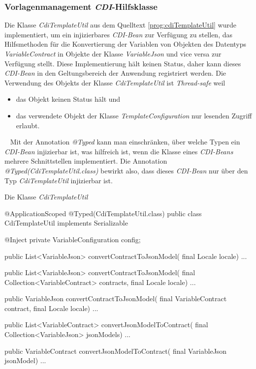 \subsubsection{Vorlagenmanagement \emph{CDI}-Hilfsklasse}
Die Klasse \emph{CdiTemplateUtil} aus dem Quelltext \ref{prog:cdiTemplateUtil} wurde implementiert, um ein injizierbares \emph{CDI-Bean} zur Verfügung zu stellen, das Hilfsmethoden für die Konvertierung der Variablen von Objekten des Datentyps \emph{VariableContract} in Objekte der Klasse \emph{VariableJson} und vice versa zur Verfügung stellt. Diese Implementierung hält keinen Status, daher kann dieses \emph{CDI-Bean} in den Geltungsbereich der Anwendung registriert werden. Die Verwendung des Objekts der Klasse \emph{CdiTemplateUtil} ist \emph{Thread-safe} weil
\begin{itemize}
	\item das Objekt keinen Status hält und
	\item das verwendete Objekt der Klasse \emph{TemplateConfiguration} nur lesenden Zugriff erlaubt.
\end{itemize}
\ \newline
Mit der Annotation \emph{@Typed} kann man einschränken, über welche Typen ein \emph{CDI-Bean} injizierbar ist, was hilfreich ist, wenn die Klasse eines \emph{CDI-Beans} mehrere Schnittstellen implementiert. Die Annotation \emph{@Typed(CdiTemplateUtil.class)} bewirkt also, dass dieses \emph{CDI-Bean} nur über den Typ \emph{CdiTemplateUtil} injizierbar ist. 

\begin{program}[h]
\caption{Die Klasse \emph{CdiTemplateUtil}}
\label{prog:cdiTemplateUtil}
\begin{JavaCode}
@ApplicationScoped
@Typed(CdiTemplateUtil.class)
public class CdiTemplateUtil implements Serializable {

    @Inject
    private VariableConfiguration config;

    public List<VariableJson> convertContractToJsonModel(
                                     final Locale locale) { ... }

    public List<VariableJson> convertContractToJsonModel(
            final Collection<VariableContract> contracts,
            final Locale locale) { ... }

    public VariableJson convertContractToJsonModel(
                    final VariableContract contract,
                    final Locale locale) { ... }
	
    public List<VariableContract> convertJsonModelToContract(
                   final Collection<VariableJson> jsonModels) { ... }

    public VariableContract convertJsonModelToContract(
                          final VariableJson jsonModel) { ... }

}
\end{JavaCode}
\end{program}

